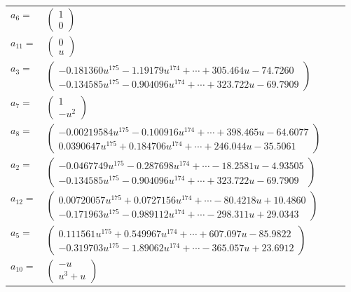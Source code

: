 \documentclass[1p]{elsarticle_modified}
\theoremstyle{definition}
\begin{document}
\begin{tabular}{m{7pt} m{180pt} m{7pt} m{180pt} }
\flushright $a_{6}=$&$\begin{pmatrix}1\\0\end{pmatrix}$ \\
\flushright $a_{11}=$&$\begin{pmatrix}0\\u\end{pmatrix}$ \\
\flushright $a_{3}=$&$\begin{pmatrix}-0.181360 u^{175}-1.19179 u^{174}+\cdots+305.464 u-74.7260\\-0.134585 u^{175}-0.904096 u^{174}+\cdots+323.722 u-69.7909\end{pmatrix}$ \\
\flushright $a_{7}=$&$\begin{pmatrix}1\\- u^2\end{pmatrix}$ \\
\flushright $a_{8}=$&$\begin{pmatrix}-0.00219584 u^{175}-0.100916 u^{174}+\cdots+398.465 u-64.6077\\0.0390647 u^{175}+0.184706 u^{174}+\cdots+246.044 u-35.5061\end{pmatrix}$ \\
\flushright $a_{2}=$&$\begin{pmatrix}-0.0467749 u^{175}-0.287698 u^{174}+\cdots-18.2581 u-4.93505\\-0.134585 u^{175}-0.904096 u^{174}+\cdots+323.722 u-69.7909\end{pmatrix}$ \\
\flushright $a_{12}=$&$\begin{pmatrix}0.00720057 u^{175}+0.0727156 u^{174}+\cdots-80.4218 u+10.4860\\-0.171963 u^{175}-0.989112 u^{174}+\cdots-298.311 u+29.0343\end{pmatrix}$ \\
\flushright $a_{5}=$&$\begin{pmatrix}0.111561 u^{175}+0.549967 u^{174}+\cdots+607.097 u-85.9822\\-0.319703 u^{175}-1.89062 u^{174}+\cdots-365.057 u+23.6912\end{pmatrix}$ \\
\flushright $a_{10}=$&$\begin{pmatrix}- u\\u^3+u\end{pmatrix}$ \\

\end{tabular}
\end{document}
